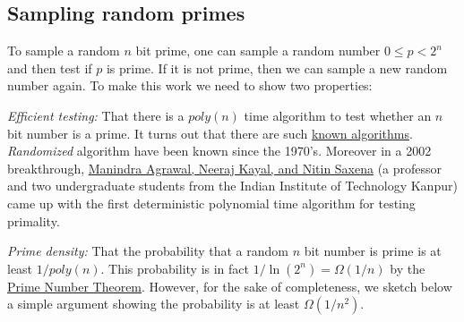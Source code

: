 \hypertarget{DHKErem}{}

\subsection{Sampling random primes}\label{Sampling-random-primes}

To sample a random \(n\) bit prime, one can sample a random number
\(0 \leq p < 2^n\) and then test if \(p\) is prime. If it is not prime,
then we can sample a new random number again. To make this work we need
to show two properties:

\emph{Efficient testing:} That there is a \(poly(n)\) time algorithm to
test whether an \(n\) bit number is a prime. It turns out that there are
such \href{https://en.wikipedia.org/wiki/Primality_test}{known
algorithms}. \emph{Randomized} algorithm have been known since the
1970's. Moreover in a 2002 breakthrough,
\href{https://goo.gl/nycWFA}{Manindra Agrawal, Neeraj Kayal, and Nitin
Saxena} (a professor and two undergraduate students from the Indian
Institute of Technology Kanpur) came up with the first deterministic
polynomial time algorithm for testing primality.

\emph{Prime density:} That the probability that a random \(n\) bit
number is prime is at least \(1/poly(n)\). This probability is in fact
\(1/\ln(2^n)=\Omega(1/n)\) by the \href{https://goo.gl/ChrXJY}{Prime
Number Theorem}. However, for the sake of completeness, we sketch below
a simple argument showing the probability is at least \(\Omega(1/n^2)\).

